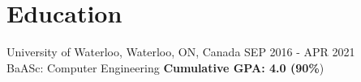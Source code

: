 \documentclass[]{friggeri-cv}
\begin{document}
\section{Education}

\begin{entrylist}
	\entry
	{University of Waterloo, Waterloo, ON, Canada \hfill{\normalfont\footnotesize SEP 2016 - APR 2021}}
	{\\{\normalsize\normalfont BaASc: Computer Engineering}}
	{\textbf{Cumulative GPA: 4.0 (90\%})}
\end{entrylist}

% 
\end{document}
